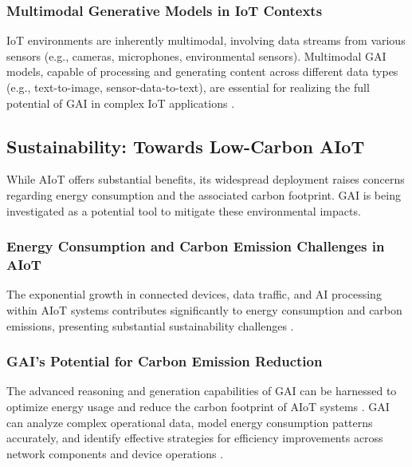 \documentclass[sigconf]{acmart}
\begin{document}
\subsubsection{Multimodal Generative Models in IoT Contexts} \label{subsubsec:multimodal_iot}
IoT environments are inherently multimodal, involving data streams from various sensors (e.g., cameras, microphones, environmental sensors). Multimodal GAI models, capable of processing and generating content across different data types (e.g., text-to-image, sensor-data-to-text), are essential for realizing the full potential of GAI in complex IoT applications \cite{ref15}.

\subsection{Sustainability: Towards Low-Carbon AIoT}
\label{subsec:sustainability}

While AIoT offers substantial benefits, its widespread deployment raises concerns regarding energy consumption and the associated carbon footprint. GAI is being investigated as a potential tool to mitigate these environmental impacts.

\subsubsection{Energy Consumption and Carbon Emission Challenges in AIoT} \label{subsubsec:energy_challenges}
The exponential growth in connected devices, data traffic, and AI processing within AIoT systems contributes significantly to energy consumption and carbon emissions, presenting substantial sustainability challenges \cite{ref29}.

\subsubsection{GAI's Potential for Carbon Emission Reduction} \label{subsubsec:gai_carbon_reduction}
The advanced reasoning and generation capabilities of GAI can be harnessed to optimize energy usage and reduce the carbon footprint of AIoT systems \cite{ref29}. GAI can analyze complex operational data, model energy consumption patterns accurately, and identify effective strategies for efficiency improvements across network components and device operations \cite{ref29}.
\end{document}
